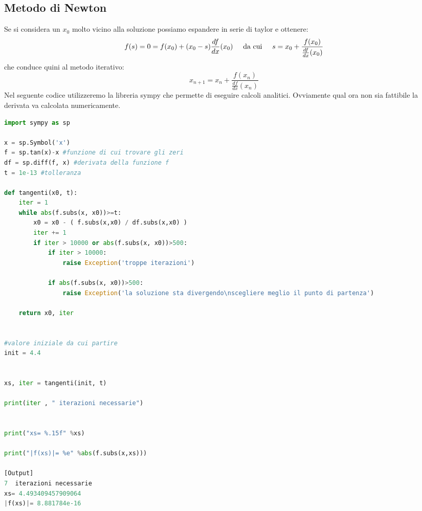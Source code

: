 \documentclass[10pt,a4paper]{article}
\begin{document}
\subsection{Metodo di Newton}
Se si considera un $x_0$ molto vicino alla soluzione possiamo espandere in serie di taylor e ottenere:
\[
f(s) = 0 = f(x_0) + (x_0-s)\frac{df}{dx}(x_0) \hspace{5 mm} \text{da cui} \hspace{5 mm} s = x_0 + \frac{f(x_0)}{\frac{df}{dx}(x_0)}
\]
che conduce quini al metodo iterativo:
\[
x_{n+1} = x_n + \frac{f(x_n)}{\frac{df}{dx}(x_n)}
\]
Nel seguente codice utilizzeremo la libreria sympy che permette di eseguire calcoli analitici. Ovviamente qual ora non sia fattibile la derivata va calcolata numericamente.
\begin{lstlisting}[language=Python]
import sympy as sp

x = sp.Symbol('x')
f = sp.tan(x)-x #funzione di cui trovare gli zeri
df = sp.diff(f, x) #derivata della funzione f
t = 1e-13 #tolleranza

def tangenti(x0, t):
    iter = 1
    while abs(f.subs(x, x0))>=t:
        x0 = x0 - ( f.subs(x,x0) / df.subs(x,x0) )
        iter += 1
        if iter > 10000 or abs(f.subs(x, x0))>500:
            if iter > 10000:
                raise Exception('troppe iterazioni')
                
            if abs(f.subs(x, x0))>500:
                raise Exception('la soluzione sta divergendo\nscegliere meglio il punto di partenza')
                
    return x0, iter


#valore iniziale da cui partire
init = 4.4


xs, iter = tangenti(init, t)

print(iter , " iterazioni necessarie")


print("xs= %.15f" %xs)

print("|f(xs)|= %e" %abs(f.subs(x,xs)))

[Output]
7  iterazioni necessarie
xs= 4.493409457909064
|f(xs)|= 8.881784e-16
\end{lstlisting}
 
\end{document}
